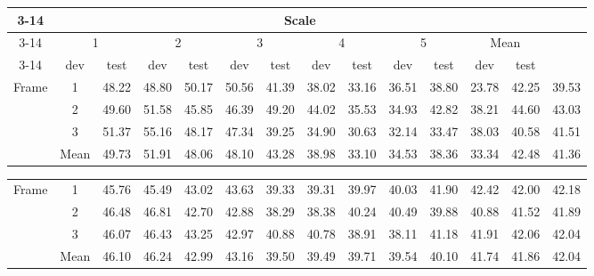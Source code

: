 \documentclass[letterpaper, 10 pt, conference]{ieeeconf}
\begin{document}
\begin{table*}[!htb]
\caption{Inter-test results on CASIA and REPLAY-ATTACK datasets.}
\label{TB_INTER_OURS}
\centering
\begin{tabular}{|c|c|c|c|c|c|c|c|c|c|c|c||c|c|}
\cline{3-14}
\multicolumn{2}{c|}{}       & \multicolumn{12}{c|}{Scale}     \\
\cline{3-14}
\multicolumn{2}{c|}{} & \multicolumn{2}{c|}{1} & \multicolumn{2}{c|}{2} & \multicolumn{2}{c|}{3} & \multicolumn{2}{c|}{4} & \multicolumn{2}{c|}{5} &  \multicolumn{2}{c|}{Mean}\\
\cline{3-14}
\multicolumn{2}{c|}{} & dev & test & dev & test & dev & test & dev & test & dev & test & dev & test \\
\hline
\multirow{3}{*}{Frame} & 1 & 48.22 & 48.80 & 50.17 & 50.56 & 41.39 & 38.02 & 33.16 & 36.51 & 38.80 & 23.78 & 42.25 & 39.53 \\ 

                       & 2 & 49.60 & 51.58 & 45.85 & 46.39 & 49.20 & 44.02 & 35.53 & 34.93 & 42.82 & 38.21 & 44.60 & 43.03 \\ 

                       & 3 & 51.37 & 55.16 & 48.17 & 47.34 & 39.25 & 34.90 & 30.63 & 32.14 & 33.47 & 38.03 & 40.58 & 41.51 \\ 
\hline
\hline
& Mean & 49.73 & 51.91 & 48.06 & 48.10 & 43.28 & 38.98 & 33.10 & 34.53 & 38.36 & 33.34 & 42.48 & 41.36 \\
\hline
\end{tabular}

\begin{tabular}{|c|c|c|c|c|c|c|c|c|c|c|c||c|c|}
\hline
\hline
\multirow{3}{*}{Frame} & 1 & 45.76 & 45.49 & 43.02 & 43.63 & 39.33 & 39.31 & 39.97 & 40.03 & 41.90 & 42.42 & 42.00 & 42.18 \\ 

                       & 2 & 46.48 & 46.81 & 42.70 & 42.88 & 38.29 & 38.38 & 40.24 & 40.49 & 39.88 & 40.88 & 41.52 & 41.89 \\ 

                       & 3 & 46.07 & 46.43 & 43.25 & 42.97 & 40.88 & 40.78 & 38.91 & 38.11 & 41.18 & 41.91 & 42.06 & 42.04 \\ 
\hline
\hline
& Mean & 46.10 & 46.24 & 42.99 & 43.16 & 39.50 & 39.49 & 39.71 & 39.54 & 40.10 & 41.74 & 41.86 & 42.04 \\
\hline
\end{tabular}
\end{table*}
\end{document}
